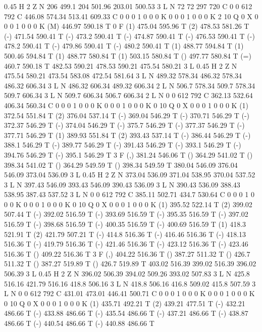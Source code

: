 0.45 H
2 Z
N
206 499.1 204 501.96 203.01 500.53 3 L
N
72 72 297 720 C
0 0 612 792 C
446.08 574.34 513.41 609.33 C
0 0 0 1 0 0 0 K
0 0 0 1 0 0 0 K
2 10 Q
0 X
0 0 0 1 0 0 0 K
(M) 446.97 590.18 T
0 F
(1) 475.04 595.96 T
(2) 478.53 581.26 T
(-) 471.54 590.41 T
(-) 473.2 590.41 T
(-) 474.87 590.41 T
(-) 476.53 590.41 T
(-) 478.2 590.41 T
(-) 479.86 590.41 T
(-) 480.2 590.41 T
(1) 488.77 594.84 T
(1) 500.46 594.84 T
(1) 488.77 580.84 T
(1) 503.15 580.84 T
() 497.77 580.84 T
(=) 460.7 590.18 T
482.53 590.21 478.53 590.21 475.54 580.21 3 L
0.45 H
2 Z
N
475.54 580.21 473.54 583.08 472.54 581.64 3 L
N
489.32 578.34 486.32 578.34 486.32 606.34 3 L
N
486.32 606.34 489.32 606.34 2 L
N
506.7 578.34 509.7 578.34 509.7 606.34 3 L
N
509.7 606.34 506.7 606.34 2 L
N
0 0 612 792 C
362.13 532.64 406.34 560.34 C
0 0 0 1 0 0 0 K
0 0 0 1 0 0 0 K
0 10 Q
0 X
0 0 0 1 0 0 0 K
(1) 372.54 551.84 T
(2) 376.04 537.14 T
(-) 369.04 546.29 T
(-) 370.71 546.29 T
(-) 372.37 546.29 T
(-) 374.04 546.29 T
(-) 375.7 546.29 T
(-) 377.37 546.29 T
(-) 377.71 546.29 T
(1) 389.93 551.84 T
(2) 393.43 537.14 T
(-) 386.44 546.29 T
(-) 388.1 546.29 T
(-) 389.77 546.29 T
(-) 391.43 546.29 T
(-) 393.1 546.29 T
(-) 394.76 546.29 T
(-) 395.1 546.29 T
3 F
(,) 381.24 546.06 T
() 364.29 541.02 T
() 398.34 541.02 T
() 364.29 549.59 T
() 398.34 549.59 T
380.04 546.09 376.04 546.09 373.04 536.09 3 L
0.45 H
2 Z
N
373.04 536.09 371.04 538.95 370.04 537.52 3 L
N
397.43 546.09 393.43 546.09 390.43 536.09 3 L
N
390.43 536.09 388.43 538.95 387.43 537.52 3 L
N
0 0 612 792 C
385.11 502.71 434.7 530.64 C
0 0 0 1 0 0 0 K
0 0 0 1 0 0 0 K
0 10 Q
0 X
0 0 0 1 0 0 0 K
(1) 395.52 522.14 T
(2) 399.02 507.44 T
(-) 392.02 516.59 T
(-) 393.69 516.59 T
(-) 395.35 516.59 T
(-) 397.02 516.59 T
(-) 398.68 516.59 T
(-) 400.35 516.59 T
(-) 400.69 516.59 T
(1) 418.3 521.91 T
(2) 421.79 507.21 T
(-) 414.8 516.36 T
(-) 416.46 516.36 T
(-) 418.13 516.36 T
(-) 419.79 516.36 T
(-) 421.46 516.36 T
(-) 423.12 516.36 T
(-) 423.46 516.36 T
() 409.22 516.36 T
3 F
(,) 404.22 516.36 T
() 387.27 511.32 T
() 426.7 511.32 T
() 387.27 519.89 T
() 426.7 519.89 T
403.02 516.39 399.02 516.39 396.02 506.39 3 L
0.45 H
2 Z
N
396.02 506.39 394.02 509.26 393.02 507.83 3 L
N
425.8 516.16 421.79 516.16 418.8 506.16 3 L
N
418.8 506.16 416.8 509.02 415.8 507.59 3 L
N
0 0 612 792 C
431.01 473.01 446.41 500.71 C
0 0 0 1 0 0 0 K
0 0 0 1 0 0 0 K
0 10 Q
0 X
0 0 0 1 0 0 0 K
(1) 435.71 492.21 T
(2) 439.21 477.51 T
(-) 432.21 486.66 T
(-) 433.88 486.66 T
(-) 435.54 486.66 T
(-) 437.21 486.66 T
(-) 438.87 486.66 T
(-) 440.54 486.66 T
(-) 440.88 486.66 T
